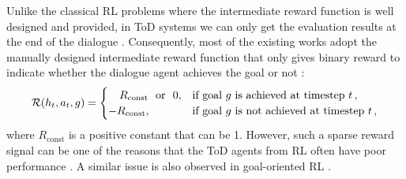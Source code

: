 Unlike the classical RL problems where the intermediate reward function is well designed and provided,
in ToD systems we can only get the evaluation results at the end of the dialogue \citep{multiwoz2018}.
Consequently, most of the existing works adopt the manually designed intermediate reward function that only gives binary reward to indicate whether the dialogue agent achieves the goal or not \citep[\eg,][]{weisz2018sample,wu2019switch,gptcritic2022}:
\begin{align*}\textstyle
 {\mathcal{R}}(h_t, a_t, g)= \begin{cases}
     ~~~R_\mathrm{const}~~\text{or}~~0, & \text{if goal}~g~\text{is achieved at timestep}~t \,,\\ 
     -R_\mathrm{const}, & \text{if goal}~g~ \text{is not achieved at timestep}~t\,,
 \end{cases}
\end{align*}
where $R_\mathrm{const}$ is a positive constant that can be 1.
However, such a sparse reward signal can be one of the reasons that the ToD agents from RL often have poor performance \citep{takanobu2019guided,wang2020learning}.
A similar issue is also observed in goal-oriented RL \citep{andrychowicz2017hindsight}. 

